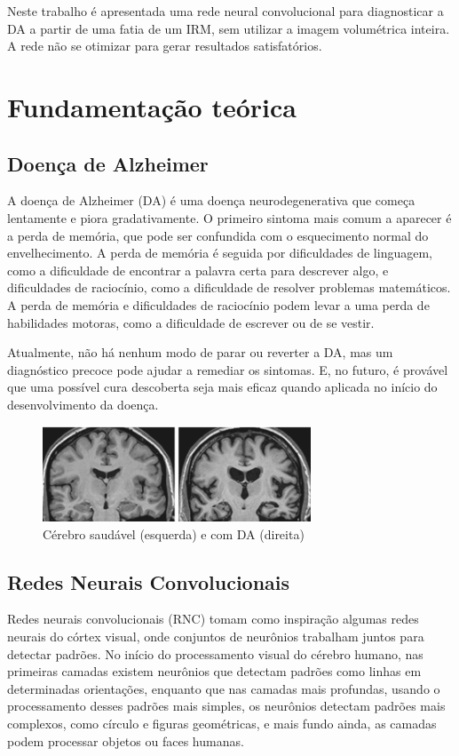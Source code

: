 \documentclass[conference]{IEEEtran}
\begin{document}
Neste trabalho é apresentada uma rede neural convolucional para diagnosticar a DA a partir de uma fatia de um IRM, sem utilizar a imagem volumétrica inteira. A rede não se otimizar para gerar resultados satisfatórios.

\section{Fundamentação teórica}

\subsection{Doença de Alzheimer}

A doença de Alzheimer (DA) é uma doença neurodegenerativa que começa lentamente e piora gradativamente. O primeiro sintoma mais comum a aparecer é a perda de memória, que pode ser confundida com o esquecimento normal do envelhecimento. A perda de memória é seguida por dificuldades de linguagem, como a dificuldade de encontrar a palavra certa para descrever algo, e dificuldades de raciocínio, como a dificuldade de resolver problemas matemáticos. A perda de memória e dificuldades de raciocínio podem levar a uma perda de habilidades motoras, como a dificuldade de escrever ou de se vestir.

Atualmente, não há nenhum modo de parar ou reverter a DA, mas um diagnóstico precoce pode ajudar a remediar os sintomas. E, no futuro, é provável que uma possível cura descoberta seja mais eficaz quando aplicada no início do desenvolvimento da doença.

\begin{figure}[H]
\centering
\includegraphics[width=8cm]{img/alzheimer.png}
\caption{Cérebro saudável (esquerda) e com DA (direita)}
\label{fig:alzheimer}
\end{figure}

\subsection{Redes Neurais Convolucionais}

Redes neurais convolucionais (RNC) tomam como inspiração algumas redes neurais do córtex visual, onde conjuntos de neurônios trabalham juntos para detectar padrões. No início do processamento visual do cérebro humano, nas primeiras camadas existem neurônios que detectam padrões como linhas em determinadas orientações, enquanto que nas camadas mais profundas, usando o processamento desses padrões mais simples, os neurônios detectam padrões mais complexos, como círculo e figuras geométricas, e mais fundo ainda, as camadas podem processar objetos ou faces humanas.
\end{document}

